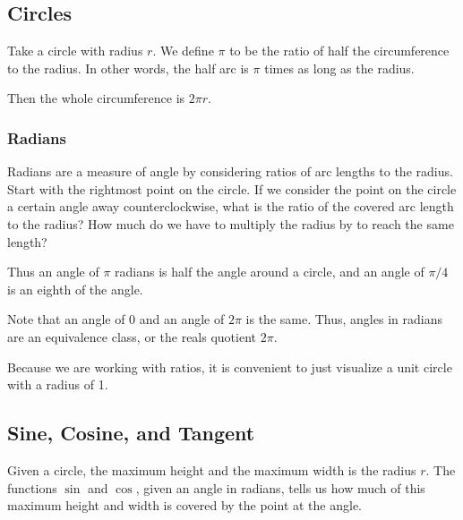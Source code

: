\documentclass[../main.tex]{subfiles}
\begin{document}
\subsection{Circles}

Take a circle with radius \( r \).
We define \( \pi \) to be the ratio of half the circumference to the radius.
In other words, the half arc is \( \pi \) times as long as the radius.
     



Then the whole circumference is \( 2\pi r \).

\subsubsection{Radians}

Radians are a measure of angle by considering ratios of arc lengths to the radius.
Start with the rightmost point on the circle.
If we consider the point on the circle a certain angle away counterclockwise,
what is the ratio of the covered arc length to the radius?
How much do we have to multiply the radius by to reach the same length?

Thus an angle of \( \pi \) radians is half the angle around a circle,
and an angle of \( \pi/4 \) is an eighth of the angle.




Note that an angle of 0 and an angle of \( 2\pi \) is the same.
Thus, angles in radians are an equivalence class, or the reals quotient \( 2\pi \).

Because we are working with ratios,
it is convenient to just visualize a unit circle with a radius of 1.

\subsection{Sine, Cosine, and Tangent}

Given a circle, the maximum height and the maximum width is the radius \( r \).
The functions \( \sin \) and \( \cos \),
given an angle in radians,
tells us how much of this maximum height and width is covered by the point at the angle.



\end{document}
